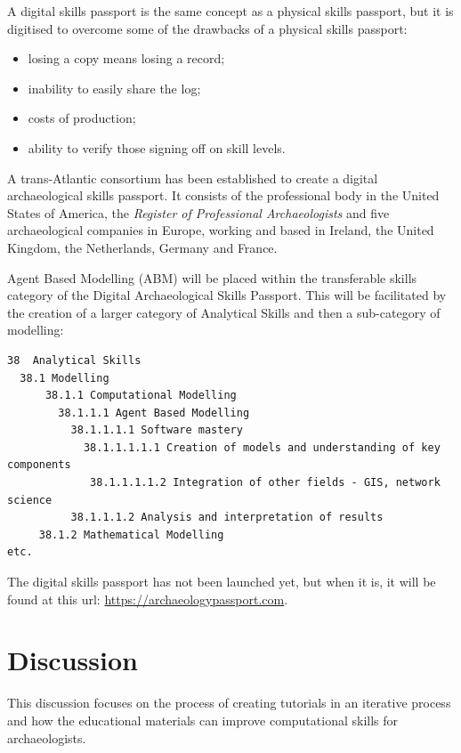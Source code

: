 \documentclass[
]{article}
\begin{document}
A digital skills passport is the same concept as a physical skills passport, but it is digitised to overcome some of the drawbacks of a physical skills passport:

\begin{itemize}
\item
  losing a copy means losing a record;
\item
  inability to easily share the log;
\item
  costs of production;
\item
  ability to verify those signing off on skill levels.~
\end{itemize}

A trans-Atlantic consortium has been established to create a digital archaeological skills passport. It consists of the professional body in the United States of America, the \emph{Register of Professional Archaeologists} and five archaeological companies in Europe, working and based in Ireland, the United Kingdom, the Netherlands, Germany and France.

Agent Based Modelling (ABM) will be placed within the transferable skills category of the Digital Archaeological Skills Passport. This will be facilitated by the creation of a larger category of Analytical Skills and then a sub-category of modelling:

\begin{verbatim}
38  Analytical Skills
  38.1 Modelling
      38.1.1 Computational Modelling
        38.1.1.1 Agent Based Modelling
          38.1.1.1.1 Software mastery
            38.1.1.1.1.1 Creation of models and understanding of key components
             38.1.1.1.1.2 Integration of other fields - GIS, network science
          38.1.1.1.2 Analysis and interpretation of results
     38.1.2 Mathematical Modelling
etc.
\end{verbatim}

The digital skills passport has not been launched yet, but when it is, it will be found at this url: \url{https://archaeologypassport.com}.

\hypertarget{discussion}{%
\section{Discussion}\label{discussion}}

This discussion focuses on the process of creating tutorials in an iterative process and how the educational materials can improve computational skills for archaeologists.
\end{document}
